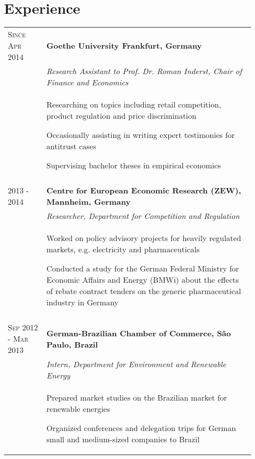 \documentclass[a4paper,10pt]{article} %
\begin{document}
\section{Experience}


\begin{tabular}{P{4.5cm} P{10cm}}

\textsc{Since Apr 2014} & \textbf{Goethe University Frankfurt, Germany}\\
  & \emph{Research Assistant to Prof. Dr. Roman Inderst, Chair of Finance and Economics}\\ 
& \begin{itemize}\footnotesize{
\item Researching on topics including retail competition, product regulation and price discrimination
\item Occasionally assisting in writing expert testimonies for antitrust cases
\item Supervising bachelor theses in empirical economics
}
\end{itemize}\\
 \\



\textsc{2013 - 2014} &  \textbf{Centre for European Economic Research (ZEW), Mannheim, Germany} \\
 & \emph{Researcher, Department for Competition and Regulation} \\
& \begin{itemize}\footnotesize{
\item Worked on policy advisory projects for heavily regulated markets, e.g. electricity and pharmaceuticals
\item Conducted a study for the German Federal Ministry for Economic Affairs and Energy (BMWi) about the effects of rebate contract tenders on the generic pharmaceutical industry in Germany
}
\end{itemize}\\
 \\



\textsc{Sep 2012 - Mar 2013} &  \textbf{German-Brazilian Chamber of Commerce, S\~ao Paulo, Brazil}\\
 & \emph{Intern, Department for Environment and  Renewable Energy}\\
& \begin{itemize}\footnotesize{
\item Prepared market studies on the Brazilian market for renewable energies
\item Organized conferences and delegation trips for German small and medium-sized companies to Brazil
}
\end{itemize}\\ 
\end{tabular}
\end{document}
